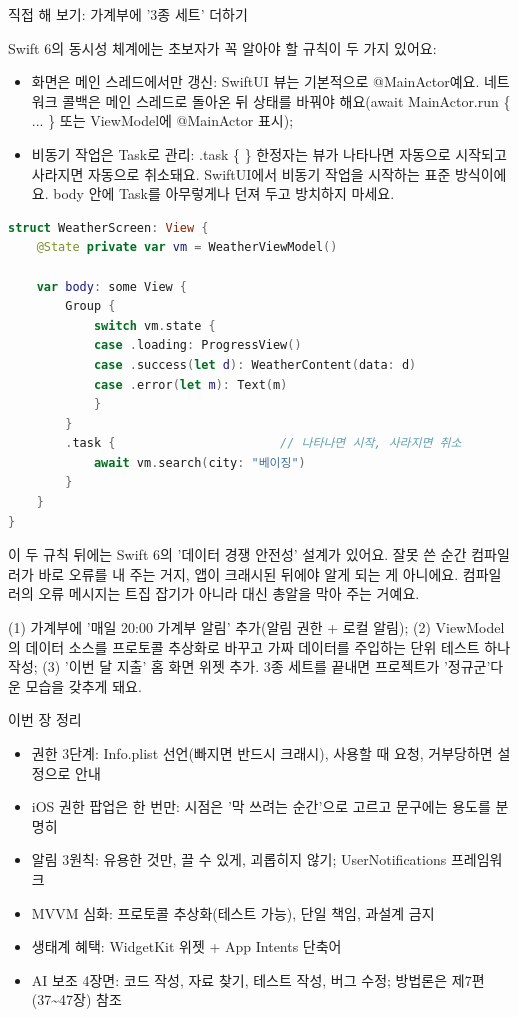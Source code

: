\begin{tcbpractice}{직접 해 보기: 가계부에 '3종 세트' 더하기}

Swift 6의 동시성 체계에는 초보자가 꼭 알아야 할 규칙이 두 가지 있어요:

\begin{itemize}
  \item 화면은 메인 스레드에서만 갱신: SwiftUI 뷰는 기본적으로 @MainActor예요. 네트워크 콜백은 메인 스레드로 돌아온 뒤 상태를 바꿔야 해요(await MainActor.run \{ ... \} 또는 ViewModel에 @MainActor 표시);
  \item 비동기 작업은 Task로 관리: .task \{ \} 한정자는 뷰가 나타나면 자동으로 시작되고 사라지면 자동으로 취소돼요. SwiftUI에서 비동기 작업을 시작하는 표준 방식이에요. body 안에 Task를 아무렇게나 던져 두고 방치하지 마세요.
\end{itemize}

\begin{lstlisting}[language=Swift]
struct WeatherScreen: View {
    @State private var vm = WeatherViewModel()

    var body: some View {
        Group {
            switch vm.state {
            case .loading: ProgressView()
            case .success(let d): WeatherContent(data: d)
            case .error(let m): Text(m)
            }
        }
        .task {                       // 나타나면 시작, 사라지면 취소
            await vm.search(city: "베이징")
        }
    }
}
\end{lstlisting}

이 두 규칙 뒤에는 Swift 6의 '데이터 경쟁 안전성' 설계가 있어요. 잘못 쓴 순간 컴파일러가 바로 오류를 내 주는 거지, 앱이 크래시된 뒤에야 알게 되는 게 아니에요. 컴파일러의 오류 메시지는 트집 잡기가 아니라 대신 총알을 막아 주는 거예요.

(1) 가계부에 '매일 20:00 가계부 알림' 추가(알림 권한 + 로컬 알림); (2) ViewModel의 데이터 소스를 프로토콜 추상화로 바꾸고 가짜 데이터를 주입하는 단위 테스트 하나 작성; (3) '이번 달 지출' 홈 화면 위젯 추가. 3종 세트를 끝내면 프로젝트가 '정규군'다운 모습을 갖추게 돼요.

\end{tcbpractice}

\begin{tcbsummary}{이번 장 정리}
\begin{itemize}
  \item 권한 3단계: Info.plist 선언(빠지면 반드시 크래시), 사용할 때 요청, 거부당하면 설정으로 안내
  \item iOS 권한 팝업은 한 번만: 시점은 '막 쓰려는 순간'으로 고르고 문구에는 용도를 분명히
  \item 알림 3원칙: 유용한 것만, 끌 수 있게, 괴롭히지 않기; UserNotifications 프레임워크
  \item MVVM 심화: 프로토콜 추상화(테스트 가능), 단일 책임, 과설계 금지
  \item 생태계 혜택: WidgetKit 위젯 + App Intents 단축어
  \item AI 보조 4장면: 코드 작성, 자료 찾기, 테스트 작성, 버그 수정; 방법론은 제7편(37\textasciitilde{}47장) 참조
\end{itemize}

\end{tcbsummary}
